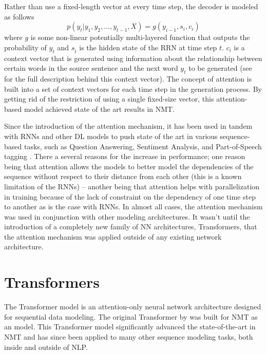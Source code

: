 Rather than use a fixed-length vector at every time step, the decoder is modeled as follows $$p(y_t \vert y_1, y_2, ..., y_{t-1}, X) = g(y_{i-1}, s_i, c_i)$$ where $g$ is some non-linear potentially multi-layered function that outputs the probability of $y_{t}$ and $s_{\hat{t}}$ is the hidden state of the RRN at time step $t$. $c_i$ is a context vector that is generated using information about the relationship between certain words in the source sentence and the next word $y_t$ to be generated (see \citet{bahdanau2014neural} for the full description behind this context vector). The concept of attention is built into a set of context vectors for each time step in the generation process. By getting rid of the restriction of using a single fixed-size vector, this attention-based model achieved state of the art results in NMT. 

Since the introduction of the attention mechanism, it has been used in tandem with RNNs and other DL models to push state of the art in various sequence-based tasks, such as Question Answering, Sentiment Analysis, and Part-of-Speech tagging \cite{chaudhari2019attentive}. There a several reasons for the increase in performance; one reason being that attention allows the models to better model the dependencies of the sequence without respect to their distance from each other (this is a known limitation of the RNNs) \cite{vaswani2017attention} -- another being that attention helps with parallelization in training because of the lack of constraint on the dependency of one time step to another as is the case with RNNs. In almost all cases, the attention mechanism was used in conjunction with other modeling architectures. It wasn't until the introduction of a completely new family of NN architectures, Transformers, that the attention mechanism was applied outside of any existing network architecture.


\section{Transformers}
The Transformer model is an attention-only neural network architecture designed for sequential data modeling. The original Transformer by \citet{vaswani2017attention} was built for NMT as an \ed{} model. This Transformer model significantly advanced the state-of-the-art in NMT and has since been applied to many other sequence modeling tasks, both inside and outside of NLP. 
\newcommand{\mb}[1]{\mathbf{#1}}

